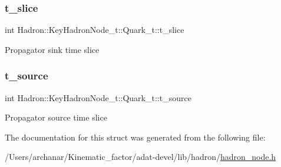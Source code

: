 \subsubsection{\texorpdfstring{t\_slice}{t\_slice}}
{\footnotesize\ttfamily int Hadron\+::\+Key\+Hadron\+Node\+\_\+t\+::\+Quark\+\_\+t\+::t\+\_\+slice}

Propagator sink time slice \mbox{\label{structHadron_1_1KeyHadronNode__t_1_1Quark__t_af7bcd4ab54e441cfbc6dbf2ba43f3fa6}} 
\subsubsection{\texorpdfstring{t\_source}{t\_source}}
{\footnotesize\ttfamily int Hadron\+::\+Key\+Hadron\+Node\+\_\+t\+::\+Quark\+\_\+t\+::t\+\_\+source}

Propagator source time slice 

The documentation for this struct was generated from the following file\+:\begin{DoxyCompactItemize}
\item 
/\+Users/archanar/\+Kinematic\+\_\+factor/adat-\/devel/lib/hadron/\mbox{\hyperlink{adat-devel_2lib_2hadron_2hadron__node_8h}{hadron\+\_\+node.\+h}}\end{DoxyCompactItemize}
